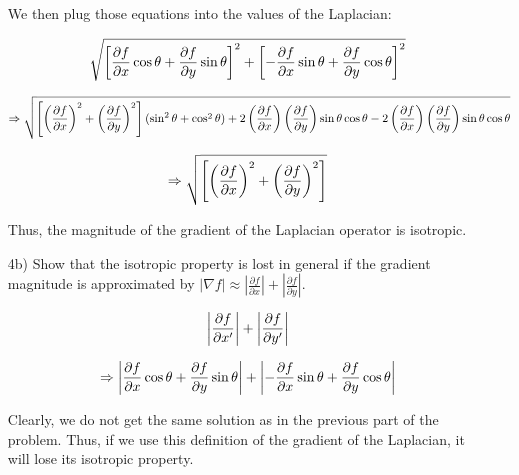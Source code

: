 \documentclass{article}
\begin{document}
\begin{enumerate}
We then plug those equations into the values of the Laplacian:

\begin{equation}
\small \sqrt{ \left[ \frac{\partial f}{\partial x} \cos\theta  + \frac{\partial f}{\partial y} \sin\theta \right] ^2 + \left[ -\frac{\partial f}{\partial x} \sin\theta + \frac{\partial f}{\partial y}\cos\theta  \right] ^2 }
\end{equation}

\begin{equation}
\small\Rightarrow \sqrt{ \left[ \left( \frac{\partial f}{\partial x} \right)^2 + \left( \frac{\partial f}{\partial y} \right)^2 \right] (\sin ^2 \theta + \cos ^2 \theta) + 2\left( \frac{\partial f}{\partial x} \right) \left( \frac{\partial f}{\partial y} \right) \sin\theta\cos\theta \\
- 2\left( \frac{\partial f}{\partial x} \right) \left( \frac{\partial f}{\partial y} \right) \sin\theta\cos\theta}
\end{equation}

\begin{equation}
\small \Rightarrow \sqrt{\left[ \left( \frac{\partial f}{\partial x} \right)^2 + \left( \frac{\partial f}{\partial y} \right)^2 \right]}
\end{equation}

Thus, the magnitude of the gradient of the Laplacian operator is isotropic.

\item[4b)] Show that the isotropic property is lost in general if the gradient magnitude is approximated by 
\large$|\nabla f|\approx |\frac{\partial f}{\partial x}|+|\frac{\partial f}{\partial y}|$. 

\begin{equation}
\small \left| \frac{\partial f}{\partial x'} \right| + \left| \frac{\partial f}{\partial y'} \right|
\end{equation}

\begin{equation}
\small \Rightarrow \left| \frac{\partial f}{\partial x} \cos\theta + \frac{\partial f}{\partial y} \sin\theta \right| + \left| - \frac{\partial f}{\partial x} \sin\theta + \frac{\partial f}{\partial y} \cos\theta \right|
\end{equation}

\normalsize Clearly, we do not get the same solution as in the previous part of the problem.  Thus, if we use this definition of the gradient of the Laplacian, it will lose its isotropic property.
\end{enumerate}
\end{document}
